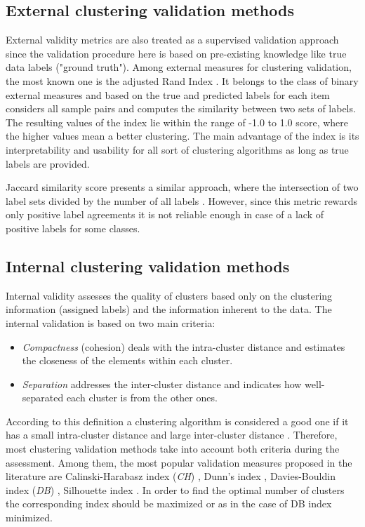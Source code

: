 \documentclass[fontsize=12pt,a4paper,twoside,openany]{scrbook}
\begin{document}
\subsection{External clustering validation methods}
External validity metrics are also treated as a supervised validation approach \parencite{Palacio19} since the validation procedure here is based on pre-existing knowledge like true data labels ("ground truth"). 
Among external measures for clustering validation, the most known one is the adjusted Rand Index \parencite{Hubert85}. It belongs to the class of binary external measures \parencite{Handl05} and based on the true and predicted labels for each item considers all sample pairs and computes the similarity between two sets of labels. The resulting values of the index lie within the range of -1.0 to 1.0 score, where the higher values mean a better clustering. The main advantage of the index is its interpretability and usability for all sort of clustering algorithms as long as true labels are provided. 

Jaccard similarity score presents a similar approach, where the intersection of two label sets divided by the number of all labels \parencite{Arnaboldi15}. However, since this metric rewards only positive label agreements \parencite{Handl05} it is not reliable enough in case of a lack of positive labels for some classes.

\subsection{Internal clustering validation methods}
Internal validity assesses the quality of clusters based only on the clustering information (assigned labels) and the information inherent to the data. The internal validation is based on two main criteria:
\begin{itemize}
  \item \emph{Compactness} (cohesion) deals with the intra-cluster distance and estimates the closeness of the elements within each cluster.
  \item \emph{Separation} addresses the inter-cluster distance and indicates how well-separated each cluster is from the other ones.
\end{itemize}
According to this definition a clustering algorithm is considered a good one if it has a small intra-cluster distance and large inter-cluster distance \parencite{Kim05}. Therefore, most clustering validation methods take into account both criteria during the assessment. Among them, the most popular validation measures proposed in the literature are Calinski-Harabasz index (\emph{CH}) \parencite{Calinski74}, Dunn's index \parencite{Dunn74}, Davies-Bouldin index (\emph{DB}) \parencite{DaviesB79}, Silhouette index \parencite{Rousseeuw87}. In order to find the optimal number of clusters the corresponding index should be maximized or as in the case of DB index minimized.
\end{document}
